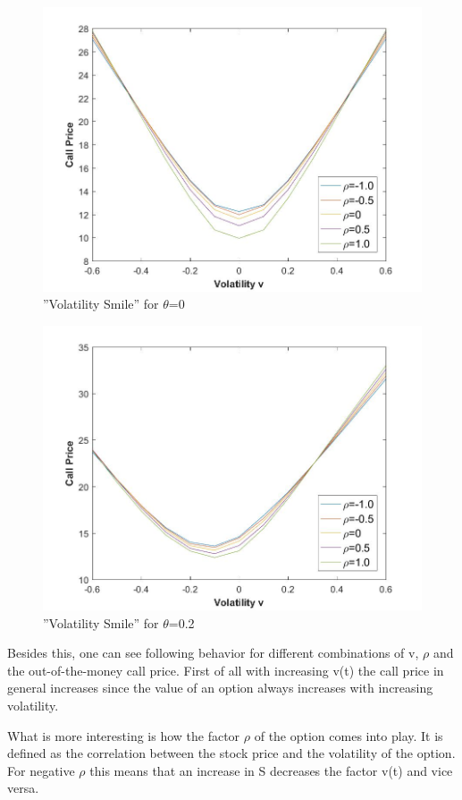 \documentclass[a4paper,11pt]{article}
\begin{document}
\begin{figure}[!h]
\includegraphics[width=12cm]{plot41.jpeg}
\centering
\caption{''Volatility Smile'' for $\theta$=0}
\label{41}
\end{figure}

\begin{figure}[!h]
\includegraphics[width=12cm]{plot42.jpeg}
\centering
\caption{''Volatility Smile'' for $\theta$=0.2}
\label{42}
\end{figure}

Besides this, one can see following behavior for different combinations of v, $\rho$ and the out-of-the-money call price. First of all with increasing v(t) the call price in general increases since the value of an option always increases with increasing volatility.

What is more interesting is how the factor $\rho$ of the option comes into play. It is defined as the correlation between the stock price and the volatility of the option. For negative $\rho$ this means that an increase in S decreases the factor v(t) and vice versa.
\end{document}
